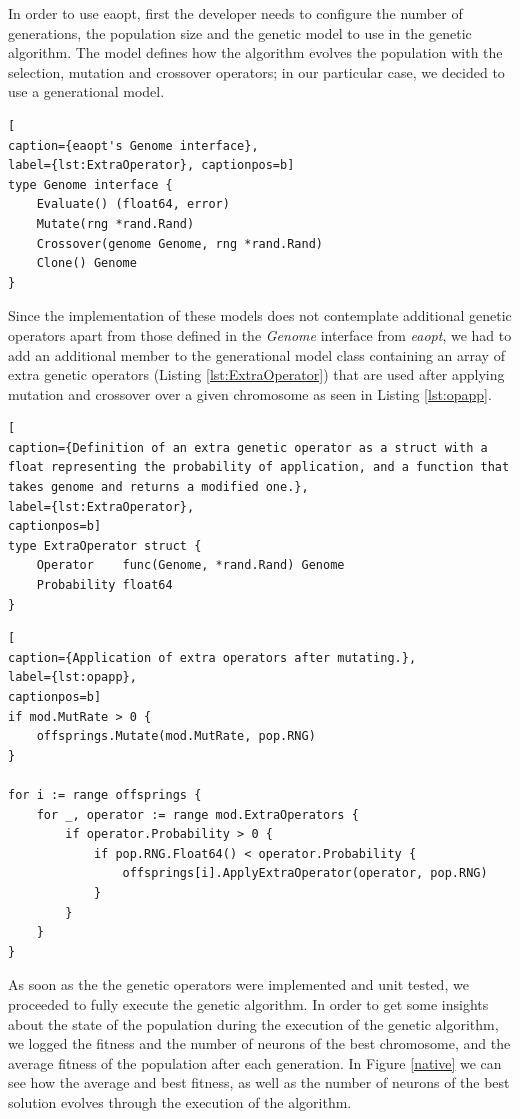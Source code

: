 In order to use eaopt, first the developer needs to configure the number of generations, the population size and the genetic model to use in the genetic algorithm. The model defines how the algorithm evolves the population with the selection, mutation and crossover operators; in our particular case, we decided to use a generational model.

\begin{lstlisting}[
caption={eaopt's Genome interface},
label={lst:ExtraOperator}, captionpos=b]
type Genome interface {
	Evaluate() (float64, error)
	Mutate(rng *rand.Rand)
	Crossover(genome Genome, rng *rand.Rand)
	Clone() Genome
}
\end{lstlisting}

Since the implementation of these models does not contemplate additional genetic operators apart from those defined in the \textit{Genome} interface from \textit{eaopt}, we had to add an additional member to the generational model class containing an array of extra genetic operators (Listing \ref{lst:ExtraOperator}) that are used after applying mutation and crossover over a given chromosome as seen in Listing \ref{lst:opapp}.

\begin{lstlisting}[
caption={Definition of an extra genetic operator as a struct with a float representing the probability of application, and a function that takes genome and returns a modified one.},
label={lst:ExtraOperator},
captionpos=b]
type ExtraOperator struct {
	Operator    func(Genome, *rand.Rand) Genome
	Probability float64
}
\end{lstlisting}

\begin{lstlisting}[
caption={Application of extra operators after mutating.},
label={lst:opapp},
captionpos=b]
if mod.MutRate > 0 {
	offsprings.Mutate(mod.MutRate, pop.RNG)
}

for i := range offsprings {
	for _, operator := range mod.ExtraOperators {
		if operator.Probability > 0 {
			if pop.RNG.Float64() < operator.Probability {
				offsprings[i].ApplyExtraOperator(operator, pop.RNG)
			}
		}
	}
}
\end{lstlisting} 

As soon as the the genetic operators were implemented and unit tested, we proceeded to fully execute the genetic algorithm.
In order to get some insights about the state of the population during the execution of the genetic algorithm, we logged the fitness and the number of neurons of the best chromosome, and the average fitness of the population after each generation. In Figure \ref{native} we can see how the average and best fitness, as well as the number of neurons of the best solution evolves through the execution of the algorithm.

